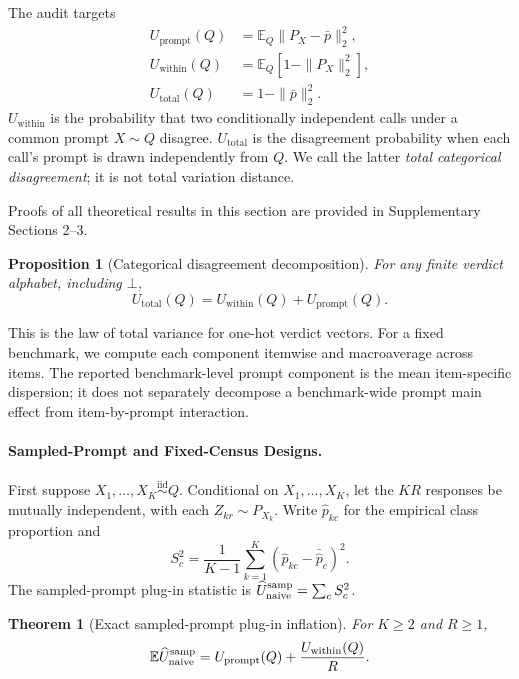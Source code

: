 \documentclass[letterpaper]{article}
\newtheorem{theorem}{Theorem}
\newtheorem{proposition}{Proposition}
\newcommand{\E}{\mathbb E}
\newcommand{\1}{\mathbf 1}
\newcommand{\Up}{U_{\mathrm{prompt}}}
\newcommand{\Uw}{U_{\mathrm{within}}}
\newcommand{\Ut}{U_{\mathrm{total}}}
\begin{document}
The audit targets
\begin{align}
\Up(Q)&=\E_Q\|P_X-\bar p\|_2^2,\label{eq:u-prompt}\\
\Uw(Q)&=\E_Q[1-\|P_X\|_2^2],\label{eq:u-within}\\
\Ut(Q)&=1-\|\bar p\|_2^2.\label{eq:u-total}
\end{align}
$\Uw$ is the probability that two conditionally independent calls
under a common prompt $X\sim Q$ disagree. $U_{\mathrm{total}}$ is the
disagreement probability when each call's prompt is drawn independently
from $Q$. We call the latter \emph{total categorical disagreement}; it
is not total variation distance.

Proofs of all theoretical results in this section are provided in
Supplementary Sections 2--3.

\begin{proposition}[Categorical disagreement decomposition]
\label{prop:categorical}
For any finite verdict alphabet, including $\bot$,
\begin{equation}
\Ut(Q)=\Uw(Q)+\Up(Q).
\label{eq:categorical-decomposition}
\end{equation}
\end{proposition}

This is the law of total variance for one-hot verdict vectors. For a fixed
benchmark, we compute each component itemwise and macroaverage across items.
The reported benchmark-level prompt component is the mean item-specific
dispersion; it does not separately decompose a benchmark-wide prompt main
effect from item-by-prompt interaction.

\paragraph{Sampled-Prompt and Fixed-Census Designs.}

First suppose $X_1,\ldots,X_K\stackrel{\mathrm{iid}}{\sim}Q$. Conditional on
$X_1,\ldots,X_K$, let the $KR$ responses be mutually independent, with each
$Z_{kr}\sim P_{X_k}$. Write
$\widehat p_{kc}$ for the empirical class proportion and
\[
S_c^2=\frac{1}{K-1}\sum_{k=1}^K
(\widehat p_{kc}-\bar{\widehat p}_c)^2.
\]
The sampled-prompt plug-in statistic is
$\widehat U_{\rm naive}^{\rm samp}=\sum_cS_c^2$.

\begin{theorem}[Exact sampled-prompt plug-in inflation]
\label{thm:sampled-bias}
For $K\ge2$ and $R\ge1$,
\begin{equation}
\E\widehat U_{\rm naive}^{\rm samp}
=\Up(Q)+\frac{\Uw(Q)}{R}.
\label{eq:sampled-bias}
\end{equation}
\end{theorem}
\end{document}
